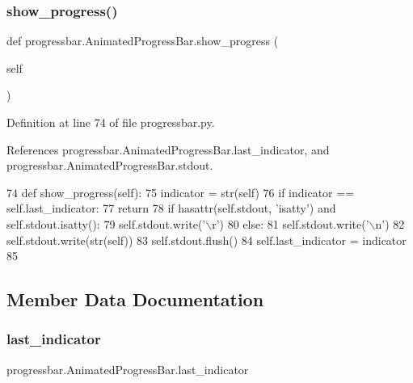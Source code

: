 \subsubsection{\texorpdfstring{show\+\_\+progress()}{show\_progress()}}
{\footnotesize\ttfamily def progressbar.\+Animated\+Progress\+Bar.\+show\+\_\+progress (\begin{DoxyParamCaption}\item[{}]{self }\end{DoxyParamCaption})}



Definition at line 74 of file progressbar.\+py.



References progressbar.\+Animated\+Progress\+Bar.\+last\+\_\+indicator, and progressbar.\+Animated\+Progress\+Bar.\+stdout.


\begin{DoxyCode}
74     \textcolor{keyword}{def }show\_progress(self):
75         indicator = str(self)
76         \textcolor{keywordflow}{if} indicator == self.last\_indicator:
77           \textcolor{keywordflow}{return}
78         \textcolor{keywordflow}{if} hasattr(self.stdout, \textcolor{stringliteral}{'isatty'}) \textcolor{keywordflow}{and} self.stdout.isatty():
79             self.stdout.write(\textcolor{stringliteral}{'\(\backslash\)r'})
80         \textcolor{keywordflow}{else}:
81             self.stdout.write(\textcolor{stringliteral}{'\(\backslash\)n'})
82         self.stdout.write(str(self))
83         self.stdout.flush()
84         self.last\_indicator = indicator
85 
\end{DoxyCode}


\subsection{Member Data Documentation}
\mbox{\label{classprogressbar_1_1AnimatedProgressBar_a50c3cb9a4b317224bd600047efb761d2}} 
\subsubsection{\texorpdfstring{last\+\_\+indicator}{last\_indicator}}
{\footnotesize\ttfamily progressbar.\+Animated\+Progress\+Bar.\+last\+\_\+indicator}



